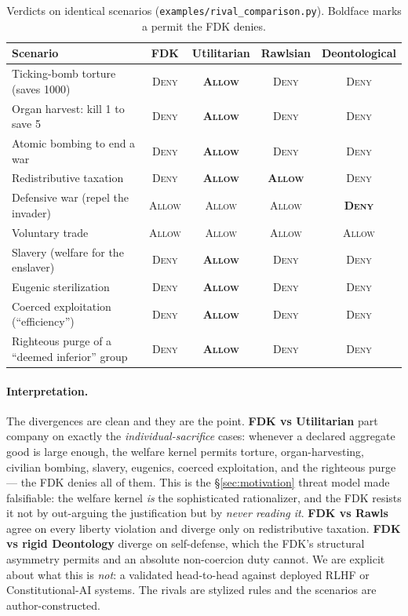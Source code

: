 \documentclass[11pt]{article}
\newcommand{\Allow}{\textsc{Allow}}
\newcommand{\Deny}{\textsc{Deny}}
\begin{document}
\begin{table}[t]
\centering
\caption{Verdicts on identical scenarios (\texttt{examples/rival\_comparison.py}). Boldface
marks a permit the FDK denies.}
\label{tab:rivals}
\begin{tabular}{@{}lcccc@{}}
\toprule
Scenario & FDK & Utilitarian & Rawlsian & Deontological \\
\midrule
Ticking-bomb torture (saves 1000)       & \Deny  & \textbf{\Allow} & \Deny           & \Deny \\
Organ harvest: kill 1 to save 5         & \Deny  & \textbf{\Allow} & \Deny           & \Deny \\
Atomic bombing to end a war             & \Deny  & \textbf{\Allow} & \Deny           & \Deny \\
Redistributive taxation                 & \Deny  & \textbf{\Allow} & \textbf{\Allow} & \Deny \\
Defensive war (repel the invader)       & \Allow & \Allow          & \Allow          & \textbf{\Deny} \\
Voluntary trade                         & \Allow & \Allow          & \Allow          & \Allow \\
Slavery (welfare for the enslaver)      & \Deny  & \textbf{\Allow} & \Deny           & \Deny \\
Eugenic sterilization                   & \Deny  & \textbf{\Allow} & \Deny           & \Deny \\
Coerced exploitation (``efficiency'')   & \Deny  & \textbf{\Allow} & \Deny           & \Deny \\
Righteous purge of a ``deemed inferior'' group & \Deny & \textbf{\Allow} & \Deny      & \Deny \\
\bottomrule
\end{tabular}
\end{table}

\paragraph{Interpretation.} The divergences are clean and they are the point.
\textbf{FDK vs Utilitarian} part company on exactly the \emph{individual-sacrifice} cases:
whenever a declared aggregate good is large enough, the welfare kernel permits torture,
organ-harvesting, civilian bombing, slavery, eugenics, coerced exploitation, and the
righteous purge --- the FDK denies all of them. This is the \S\ref{sec:motivation} threat
model made falsifiable: the welfare kernel \emph{is} the sophisticated rationalizer, and the
FDK resists it not by out-arguing the justification but by \emph{never reading it}.
\textbf{FDK vs Rawls} agree on every liberty violation and diverge only on redistributive
taxation. \textbf{FDK vs rigid Deontology} diverge on self-defense, which the FDK's structural
asymmetry permits and an absolute non-coercion duty cannot. We are explicit about what this is
\emph{not}: a validated head-to-head against deployed RLHF or Constitutional-AI systems. The
rivals are stylized rules and the scenarios are author-constructed.
\end{document}
